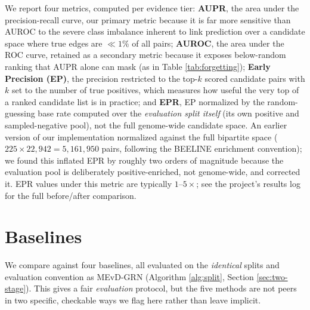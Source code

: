 \documentclass{article}
\theoremstyle{plain}
\theoremstyle{definition}
\begin{document}
We report four metrics, computed per evidence tier: \textbf{AUPR}, the area
under the precision-recall curve, our primary metric because it is far more
sensitive than AUROC to the severe class imbalance inherent to link prediction
over a candidate space where true edges are $\ll 1\%$ of all pairs;
\textbf{AUROC}, the area under the ROC curve, retained as a secondary metric
because it exposes below-random ranking that AUPR alone can mask (as in Table
\ref{tab:forgetting}); \textbf{Early Precision (EP)}, the precision restricted
to the top-$k$ scored candidate pairs with $k$ set to the number of true
positives, which measures how useful the very top of a ranked candidate list
is in practice; and \textbf{EPR}, EP normalized by the random-guessing base
rate computed over the \emph{evaluation split itself} (its own positive and
sampled-negative pool), not the full genome-wide candidate space. An earlier
version of our implementation normalized against the full bipartite space
($225\times22{,}942=5{,}161{,}950$ pairs, following the BEELINE enrichment
convention); we found this inflated EPR by roughly two orders of magnitude
because the evaluation pool is deliberately positive-enriched, not
genome-wide, and corrected it. EPR values under this metric are typically
$1$--$5\times$; see the project's results log for the full before/after
comparison.

\section{Baselines}
\label{sec:baselines}

We compare against four baselines, all evaluated on the \emph{identical}
splits and evaluation convention as MEvD-GRN (Algorithm \ref{alg:split},
Section \ref{sec:two-stage}). This gives a fair \emph{evaluation} protocol,
but the five methods are not peers in two specific, checkable ways we flag
here rather than leave implicit.
\end{document}
